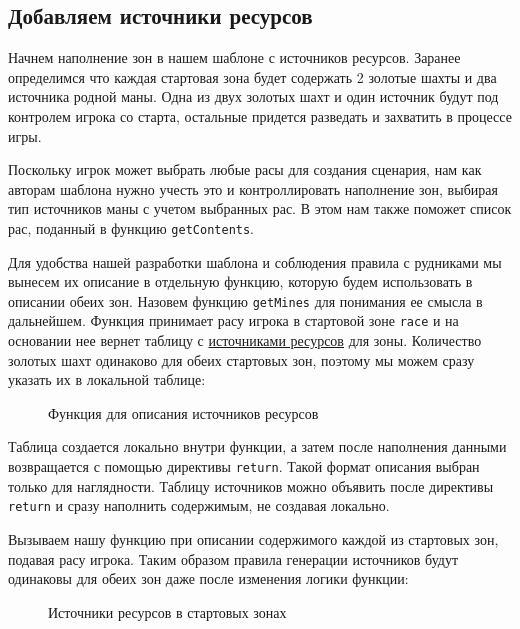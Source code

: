 \subsection{Добавляем источники ресурсов}
Начнем наполнение зон в нашем шаблоне с источников ресурсов. Заранее определимся что каждая стартовая зона будет содержать 2 золотые шахты и два источника родной маны. Одна из двух золотых шахт и один источник будут под контролем игрока со старта, остальные придется разведать и захватить в процессе игры.

Поскольку игрок может выбрать любые расы для создания сценария, нам как авторам шаблона нужно учесть это и контроллировать наполнение зон, выбирая тип источников маны с учетом выбранных рас. В этом нам также поможет список рас, поданный в функцию \texttt{getContents}.

Для удобства нашей разработки шаблона и соблюдения правила с рудниками мы вынесем их описание в отдельную функцию, которую будем использовать в описании обеих зон.
Назовем функцию \texttt{getMines} для понимания ее смысла в дальнейшем.
Функция принимает расу игрока в стартовой зоне \texttt{race} и на основании нее вернет таблицу с \hyperref[crystals]{источниками ресурсов} для зоны.
Количество золотых шахт одинаково для обеих стартовых зон, поэтому мы можем сразу указать их в локальной таблице:

\begin{figure}[H]

\caption{Функция для описания источников ресурсов}
\end{figure}

Таблица создается локально внутри функции, а затем после наполнения данными возвращается с помощью директивы \texttt{return}. Такой формат описания выбран только для наглядности. Таблицу источников можно объявить после директивы \texttt{return} и сразу наполнить содержимым, не создавая локально.

Вызываем нашу функцию при описании содержимого каждой из стартовых зон, подавая расу игрока. Таким образом правила генерации источников будут одинаковы для обеих зон даже после изменения логики функции:

\begin{figure}[H]


\caption{Источники ресурсов в стартовых зонах}
\end{figure}

